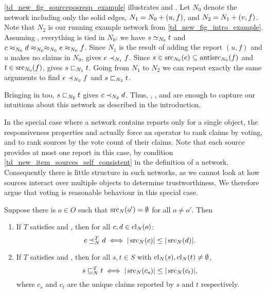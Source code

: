 \begin{example}
    \label{td_new_ex_posresps}
    \cref{td_new_fig_sourceposresp_example} illustrates \freshposresp{} and
    \sourceposresp{}. Let $N_0$ denote the network including only the solid
    edges, $N_1 = {N_0} + ({u}, {f})$, and $N_2 = {N_1} + ({v}, {f})$. Note
    that $N_2$ is our running example network from
    \cref{td_new_fig_intro_example}.
    Assuming \symmetry{}, everything is tied in $N_0$: we have $s \simeq_{N_0} t$
    and $c \approx_{N_0} d \approx_{N_0} \approx_{N_0} e \approx_{N_0} f$. Since $N_1$ is
    the result of adding the report $(u, f)$ and $u$ makes no claims in $N_0$,
    \freshposresp{} gives $e \prec_{N_1} f$. Since $s \in \operatorname{src}_{N_0}(e)
    \subseteq \operatorname{antisrc}_{N_0}(f)$ and $t \in \operatorname{src}_{N_0}(f)$, \sourceposresp{}
    gives $s \sqsubset_{N_1} t$. Going from $N_1$ to $N_2$ we can repeat exactly the
    same arguments to find $e \prec_{N_2} f$ and $s \sqsubset_{N_2} t$.

    Bringing \claimcoherence{} in too, $s \sqsubset_{N_2} t$ gives $c \prec_{N_2} d$.
    Thus, \claimcoherence{}, \symmetry{}, \freshposresp{} and \sourceposresp{}
    are enough to capture our intuitions about this network as described in the
    introduction.
\end{example}

In the special case where a network contains reports only for a single object,
the responsiveness properties and \symmetry{} actually force an operator to
rank claims by voting, and to rank sources by the vote count of their claims.
Note that each source provides at most one report in this case, by condition
\cref{td_new_item_sources_self_consistent} in the definition of a network.
Consequently there is little structure in such networks, as we cannot look at
how sources interact over multiple objects to determine trustworthiness. We
therefore argue that voting is reasonable behaviour in this special case.

\begin{proposition}
    \label{td_new_prop_symm_fpr_single_object_voting}
    Suppose there is $o \in O$ such that $\operatorname{src}_N(o') = \emptyset$ for all $o
    \ne o'$. Then
    \begin{enumerate}
        \item\label{td_new_item_prop_symm_fpr_single_object_voting_claims}
        If $T$ satisfies \symmetry{} and \freshposresp{}, then for all $c, d
            \in \operatorname{cl}_N(o)$:
        \[
            c \preceq_N^T d \iff |\operatorname{src}_N(c)| \le |\operatorname{src}_N(d)|.
        \]
        \item\label{td_new_item_prop_symm_fpr_single_object_voting_sources}
        If $T$ satisfies \symmetry{} and \sourceposresp{}, then for all $s, t
            \in S$ with $\operatorname{cl}_N(s), \operatorname{cl}_N(t) \ne \emptyset$,
        \[
            s \sqsubseteq_N^T t
            \iff
            |\operatorname{src}_N(c_s)| \le |\operatorname{src}_N(c_t)|,
        \]
        where $c_s$ and $c_t$ are the unique claims reported by $s$ and $t$
        respectively.
    \end{enumerate}
\end{proposition}

